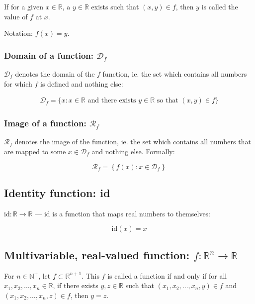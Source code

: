 \documentclass[titlepage]{article}
\begin{document}
          If for a given $x \in \mathbb{R}$, a $y \in \mathbb{R}$ exists such
          that $(x, y) \in f$, then $y$ is called the value of $f$ at $x$.

          Notation: $f(x) = y$.

        \subsubsection{Domain of a function: $\mathcal{D}_f$}

          $\mathcal{D}_f$ denotes the domain of the $f$ function, ie. the set
          which contains all numbers for which $f$ is defined and nothing else:

          \begin{align*}
            \mathcal{D}_f
              = \{
                  x
                  : x \in \mathbb{R} \text{ and there exists } y \in \mathbb{R}
                    \text{ so that } (x, y) \in f
                \}
          \end{align*}

        \subsubsection{Image of a function: $\mathcal{R}_f$}

          $\mathcal{R}_f$ denotes the image of the function, ie. the set which
          contains all numbers that are mapped to some $x \in \mathcal{D}_f$ and
          nothing else. Formally:

          $$\mathcal{R}_f = \left\{ f(x) : x \in \mathcal{D}_f\right\}$$

      \subsection{Identity function: id}

        $\text{id} : \mathbb{R} \rightarrow \mathbb{R}$ --- $\text{id}$ is a
        function that maps real numbers to themselves:

        $$\text{id}(x) = x$$

      \subsection{%
        Multivariable, real-valued function:
        $f : \mathbb{R}^n \rightarrow \mathbb{R}$
      }

        For $n \in \mathbb{N}^+$, let $f \subset \mathbb{R}^{n+1}$. This $f$
        is called a function if and only if for all
        $x_1, x_2, \dots, x_n \in \mathbb{R}$, if there exists
        $y, z \in \mathbb{R}$ such that $(x_1, x_2, \dots, x_n, y) \in f$ and
        $(x_1, x_2, \dots, x_n, z) \in f$, then
        $y = z$.
\end{document}
